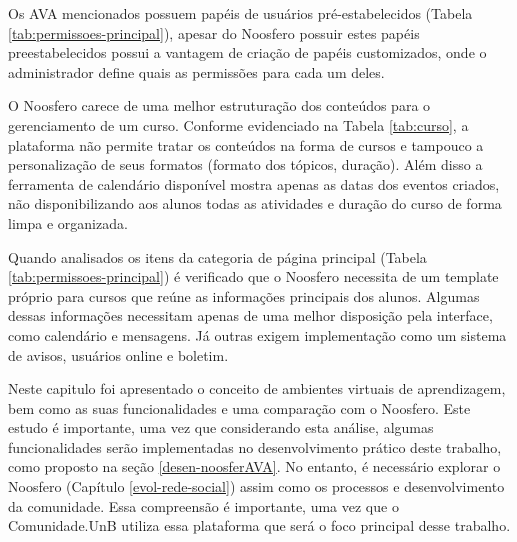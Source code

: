 Os AVA mencionados possuem papéis de usuários pré-estabelecidos (Tabela \ref{tab:permissoes-principal}), apesar do Noosfero possuir estes papéis preestabelecidos possui a vantagem de criação de papéis customizados, onde o administrador define quais as permissões para cada um deles.

O Noosfero carece de uma melhor estruturação dos conteúdos para o gerenciamento de um curso. Conforme evidenciado na Tabela \ref{tab:curso}, a plataforma não permite tratar os conteúdos na forma de cursos e tampouco a personalização de seus formatos (formato dos tópicos, duração). Além disso a ferramenta de calendário disponível mostra apenas as datas dos eventos criados, não disponibilizando aos alunos todas as atividades e duração do curso de forma limpa e organizada.

Quando analisados os itens da categoria de página principal (Tabela \ref{tab:permissoes-principal}) é verificado que o Noosfero necessita de um template próprio para cursos que reúne as informações principais dos alunos. Algumas dessas informações necessitam apenas de uma melhor disposição pela interface, como calendário e mensagens. Já outras exigem implementação como um sistema de avisos, usuários online e boletim.

Neste capitulo foi apresentado o conceito de ambientes virtuais de aprendizagem, bem como as  suas funcionalidades e uma comparação com o Noosfero. Este estudo é importante, uma vez que considerando esta análise, algumas funcionalidades serão implementadas no desenvolvimento prático deste trabalho, como proposto na seção \ref{desen-noosferAVA}. No entanto, é necessário explorar o Noosfero (Capítulo \ref{evol-rede-social}) assim como os processos e desenvolvimento da comunidade. Essa compreensão é importante, uma vez que o Comunidade.UnB utiliza essa plataforma que será o foco principal desse trabalho.
